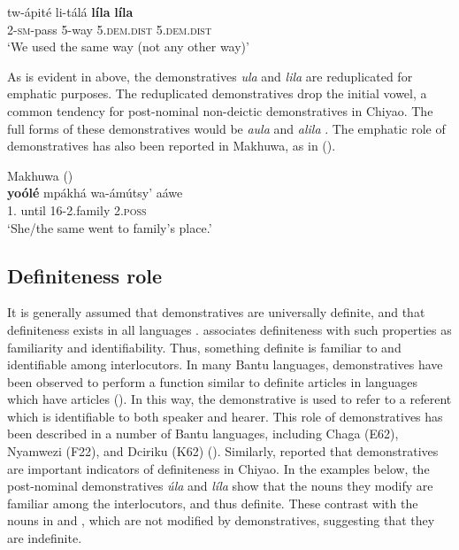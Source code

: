 \documentclass[output=paper,
            colorlinks, citecolor=brown
            ,draftmode
		  ]{langscibook}
\begin{document}
    \ex\label{ex:taji:32b} \gll  tw-ápité        li-tálá      \textbf{líla}                        \textbf{líla}\\
      2-\textsc{sm}-pass    5-way      5.\textsc{dem.dist}      5.\textsc{dem.dist}\\
     \glt ‘We used the same way (not any other way)’
    \z
\z

As is evident in  above, the demonstratives \textit{ula}  and \textit{lila}  are reduplicated for emphatic purposes. The reduplicated demonstratives drop the initial vowel, a common tendency for post-nominal non-deictic demonstratives in Chiyao. The full forms of these demonstratives would be \textit{aula}  and \textit{alila} . The emphatic role of demonstratives has also been reported in Makhuwa, as in  (\citealt[186]{vanderWal2010}). 

\ea Makhuwa (\citealt[186]{vanderWal2010})\\
    \label{ex:taji:33}
    \gll \textbf{yoólé}                  mpákhá      wa-ámútsy’      aáwe\\
  1.    until          16-2.family      2.\textsc{poss}\\
  \glt ‘She/the same went to family’s place.’   
\z

\subsection{Definiteness role}\label{sec:taji:6.3}

It is generally assumed that demonstratives are universally definite, and that definiteness exists in all languages \citep{Lyons1999}. \citet[2]{Lyons1999} associates definiteness with such properties as familiarity and identifiability. Thus, something definite is familiar to and identifiable among interlocutors. In many Bantu languages, demonstratives have been observed to perform a function similar to definite articles in languages which have articles (\citealt{VandeVelde2005}). In this way, the demonstrative is used to refer to a referent which is identifiable to both speaker and hearer. This role of demonstratives has been described in a number of Bantu languages, including Chaga (E62), Nyamwezi (F22), and Dciriku (K62) (\citealt{VandeVelde2005}). Similarly, \citet[53]{Taji2020} reported that demonstratives are important indicators of definiteness in Chiyao. In the examples below, the post-nominal demonstratives \textit{úla}  and \textit{líla}  show that the nouns they modify are familiar among the interlocutors, and thus definite. These contrast with the nouns in  and , which are not modified by demonstratives, suggesting that they are indefinite.
\end{document}
